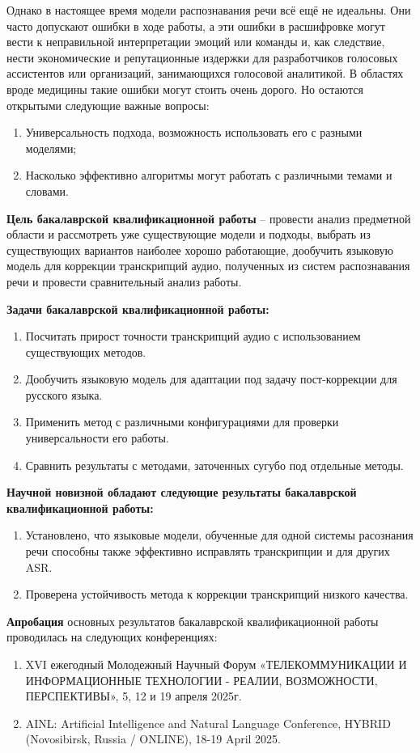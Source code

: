 Однако в настоящее время модели распознавания речи всё ещё не идеальны.
Они часто допускают ошибки в ходе работы, а эти ошибки в расшифровке могут вести к неправильной интерпретации эмоций или команды и, как следствие, нести экономические и репутационные издержки для разработчиков голосовых ассистентов или организаций, занимающихся голосовой аналитикой.
В областях вроде медицины такие ошибки могут стоить очень дорого.
Но остаются открытыми следующие важные вопросы:
\begin{enumerate}
\item Универсальность подхода, возможность использовать его с разными моделями;
\item Насколько эффективно алгоритмы могут работать с различными темами и словами.
\end{enumerate}

\newpage

\textbf{Цель бакалаврской квалификационной работы} -- провести анализ предметной области и рассмотреть уже существующие модели и подходы, выбрать из существующих вариантов наиболее хорошо работающие, дообучить языковую модель для коррекции транскрипций аудио, полученных из систем распознавания речи и провести сравнительный анализ работы.

\textbf{Задачи бакалаврской квалификационной работы:}
\begin{enumerate}
\item Посчитать прирост точности транскрипций аудио с использованием существующих методов. 
\item Дообучить языковую модель для адаптации под задачу пост-коррекции для русского языка.
\item Применить метод с различными конфигурациями для проверки универсальности его работы. 
\item Сравнить результаты с методами, заточенных сугубо под отдельные методы.
\end{enumerate}


\textbf{Научной новизной обладают следующие результаты бакалаврской
  квалификационной работы:}
\begin{enumerate}
\item Установлено, что языковые модели, обученные для одной системы расознания речи способны также эффективно исправлять транскрипции и для других ASR.
\item Проверена устойчивость метода к коррекции транскрипций низкого качества.
\end{enumerate}


\textbf{Апробация} основных результатов бакалаврской квалификационной работы проводилась на следующих конференциях:
\begin{enumerate}
  \item XVI ежегодный Молодежный Научный Форум «ТЕЛЕКОММУНИКАЦИИ И ИНФОРМАЦИОННЫЕ ТЕХНОЛОГИИ - РЕАЛИИ, ВОЗМОЖНОСТИ, ПЕРСПЕКТИВЫ», 5, 12 и 19 апреля 2025г.
  \item AINL: Artificial Intelligence and Natural Language Conference, HYBRID (Novosibirsk, Russia / ONLINE), 18-19 April 2025.
\end{enumerate}
